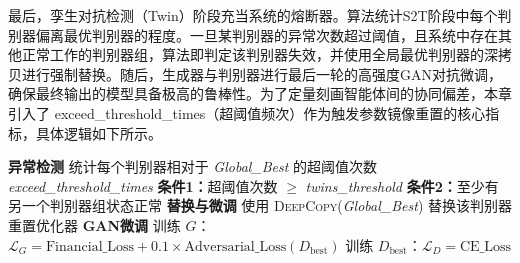 
最后，孪生对抗检测（Twin）阶段充当系统的熔断器。算法统计S2T阶段中每个判别器偏离最优判别器的程度。一旦某判别器的异常次数超过阈值，且系统中存在其他正常工作的判别器组，算法即判定该判别器失效，并使用全局最优判别器的深拷贝进行强制替换。随后，生成器与判别器进行最后一轮的高强度GAN对抗微调，确保最终输出的模型具备极高的鲁棒性。为了定量刻画智能体间的协同偏差，本章引入了 exceed\_threshold\_times（超阈值频次）作为触发参数镜像重置的核心指标，具体逻辑如下所示。

\begin{algorithm}[H]
\caption{孪生对抗检测（Twin）算法流程}
\label{alg:twin_adversarial_detection}
\begin{algorithmic}[0]
\State \textbf{异常检测}
\State 统计每个判别器相对于 \textit{Global\_Best} 的超阈值次数 \textit{exceed\_threshold\_times}
\State \textbf{条件1：}超阈值次数 $\geq$ \textit{twins\_threshold}
\State \textbf{条件2：}至少有另一个判别器组状态正常
\Statex
\State \textbf{替换与微调}
        \State 使用 \textsc{DeepCopy}(\textit{Global\_Best}) 替换该判别器
        \State 重置优化器
    \EndIf
\EndFor
\Statex
\State \textbf{GAN微调}
    \State 训练 $G$：$\mathcal{L}_G = \text{Financial\_Loss} + 0.1 \times \text{Adversarial\_Loss}(D_{\text{best}})$
    \State 训练 $D_{\text{best}}$：$\mathcal{L}_D = \text{CE\_Loss}$
\EndFor
\end{algorithmic}
\end{algorithm}

